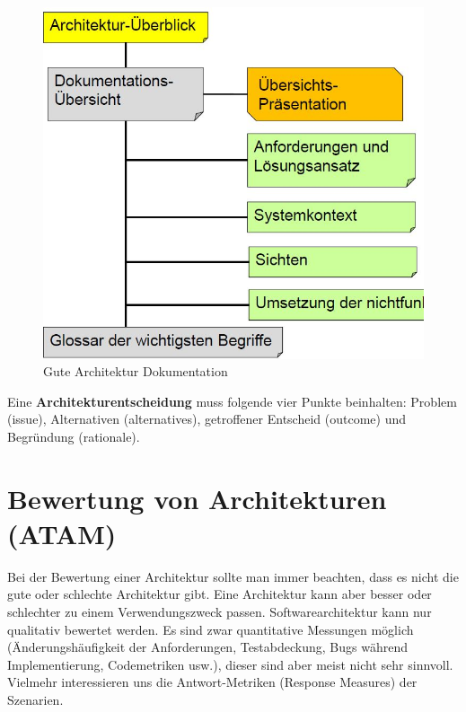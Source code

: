 \begin{figure}[h!]
\centering
\includegraphics[width=0.5\linewidth]{fig/gute-architektur-dokumentation}
\caption{Gute Architektur Dokumentation}
\label{fig:gute-architektur-dokumentation}
\end{figure}

Eine \textbf{Architekturentscheidung} muss folgende vier Punkte beinhalten: Problem (issue), Alternativen (alternatives), getroffener Entscheid (outcome) und Begründung (rationale). 

\section{Bewertung von Architekturen (ATAM)}

Bei der Bewertung einer Architektur sollte man immer beachten, dass es nicht die gute oder schlechte Architektur gibt. Eine Architektur kann aber besser oder schlechter zu einem Verwendungszweck passen. Softwarearchitektur kann nur qualitativ bewertet werden. Es sind zwar quantitative Messungen möglich (Änderungshäufigkeit der Anforderungen, Testabdeckung, Bugs während Implementierung, Codemetriken usw.), dieser sind aber meist nicht sehr sinnvoll. Vielmehr interessieren uns die Antwort-Metriken (Response Measures) der Szenarien.

